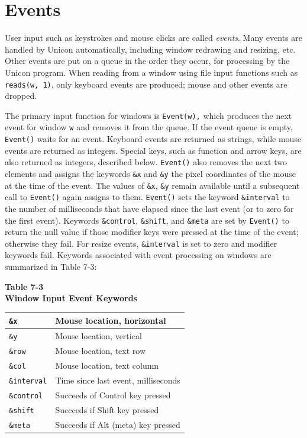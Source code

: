 \section{Events}

User input such as keystrokes and mouse clicks are called
\textit{events}. Many events are handled by Unicon automatically,
including window redrawing and resizing, etc.  Other events are put on
a queue in the order they occur, for processing by the Unicon
program. When reading from a window using file input functions such as
\texttt{reads(w, 1)}, only keyboard events are produced; mouse and
other events are dropped.

The primary input function for windows is \texttt{Event(w),} which
produces the next event for window \texttt{w} and removes it from the
queue. If the event queue is empty, \texttt{Event()} waits for an
event. Keyboard events are returned as strings, while mouse events are
returned as integers. Special keys, such as function and arrow keys,
are also returned as integers, described below. \texttt{Event()} also
removes the next two elements and assigns the keywords \texttt{\&x}
and \texttt{\&y} the pixel coordinates of the mouse at the time of the
event. The values of \texttt{\&x}, \texttt{\&y} remain available until
a subsequent call to \texttt{Event()} again assigns to them.
\texttt{Event()} sets the keyword \texttt{\&interval} to the number of
milliseconds that have elapsed since the last event (or to zero for
the first event). Keywords \texttt{\&control}, \texttt{\&shift}, and
\texttt{\&meta} are set by \texttt{Event()} to return the null value
if those modifier keys were pressed at the time of the event;
otherwise they fail. For resize events, \texttt{\&interval} is set to
zero and modifier keywords fail. Keywords associated with event
processing on windows are summarized in Table 7-3:

\begin{center}
{\sffamily\bfseries Table 7-3} \\
{\sffamily\bfseries Window Input Event Keywords}

\begin{supertabular}{|m{0.90in}|m{2.7in}|}
\texttt{\&x} &
Mouse location, horizontal\\\hline
\texttt{\&y} &
Mouse location, vertical\\\hline
\texttt{\&row} &
Mouse location, text row\\\hline
\texttt{\&col} &
Mouse location, text column\\\hline
\texttt{\&interval} &
Time since last event, milliseconds\\\hline
\texttt{\&control} &
Succeeds of Control key pressed\\\hline
\texttt{\&shift} &
Succceds if Shift key pressed\\\hline
\texttt{\&meta} &
Succeeds if Alt (meta) key pressed\\\hline
\end{supertabular}
\end{center}

